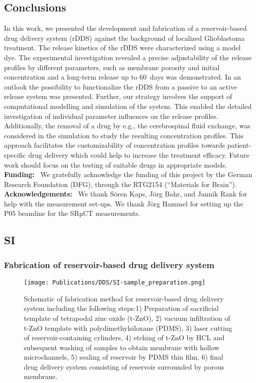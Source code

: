 \subsection{Conclusions}
In this work, we presented the development and fabrication of a reservoir-based drug delivery system (rDDS) against the background of localized Glioblastoma treatment. The release kinetics of the rDDS were characterized using a model dye. The experimental investigation revealed a precise adjustability of the release profiles by different parameters, such as membrane porosity and initial concentration and a long-term release up to 60~days was demonstrated. In an outlook the possibility to functionalize the rDDS from a passive to an active release system was presented. Further, our strategy involves the support of computational modelling and simulation of the system. This enabled the detailed investigation of individual parameter influences on the release profiles. Additionally, the removal of a drug by e.g., the cerebrospinal fluid exchange, was considered in the simulation to study the resulting concentration profiles. This approach facilitates the customizability of concentration profiles towards patient-specific drug delivery which could help to increase the treatment efficacy. Future work should focus on the testing of suitable drugs in appropriate models. \\

\textbf{Funding: }~We gratefully acknowledge the funding of this project by the German Research Foundation (DFG), through the RTG2154 (“Materials for Brain”). \\

\textbf{Acknowledgements: }~We thank Sören Kaps, Jörg Bahr, and Jannik Rank for help with the measurement set-ups. We thank Jörg Hammel for setting up the P05 beamline for the SRµCT measurements.

\newpage
\subsection{SI}

\subsubsection*{Fabrication of reservoir-based drug delivery system}
  \begin{figure}[ht!]
    \centering
    \texttt{[image: Publications/DDS/SI-sample\_preparation.png]}
    \caption{Schematic of fabrication method for reservoir-based drug delivery system including the following steps:1) Preparation of sacrificial template of tetrapodal zinc oxide (t-ZnO), 2) vacuum infiltration of t-ZnO template with polydimethylsiloxane (PDMS), 3) laser cutting of reservoir-containing cylinders, 4) etching of t-ZnO by HCL and subsequent washing of samples to obtain membrane with hollow microchannels, 5) sealing of reservoir by PDMS thin film, 6) final drug delivery system consisting of reservoir surrounded by porous membrane.}
    \label{fig:SamplePreparation}
  \end{figure}


